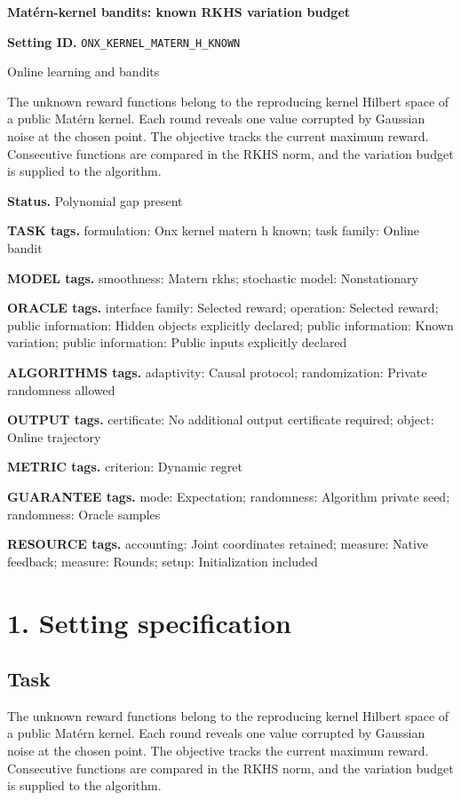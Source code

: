 \documentclass[10pt,a4paper]{article}
\begin{document}
\raggedright

{\LARGE\bfseries\sffamily\color{AtlasNavy} Matérn-kernel bandits: known RKHS variation budget\par}\vspace{5pt}
\textbf{Setting ID.} \texttt{ONX\_\allowbreak{}KERNEL\_\allowbreak{}MATERN\_\allowbreak{}H\_\allowbreak{}KNOWN}

Online learning and bandits

The unknown reward functions belong to the reproducing kernel Hilbert space of a public Matérn kernel. Each round reveals one value corrupted by Gaussian noise at the chosen point. The objective tracks the current maximum reward. Consecutive functions are compared in the RKHS norm, and the variation budget is supplied to the algorithm.

\textbf{Status.} Polynomial gap present

\textbf{TASK tags.} formulation: Onx kernel matern h known; task family: Online bandit

\textbf{MODEL tags.} smoothness: Matern rkhs; stochastic model: Nonstationary

\textbf{ORACLE tags.} interface family: Selected reward; operation: Selected reward; public information: Hidden objects explicitly declared; public information: Known variation; public information: Public inputs explicitly declared

\textbf{ALGORITHMS tags.} adaptivity: Causal protocol; randomization: Private randomness allowed

\textbf{OUTPUT tags.} certificate: No additional output certificate required; object: Online trajectory

\textbf{METRIC tags.} criterion: Dynamic regret

\textbf{GUARANTEE tags.} mode: Expectation; randomness: Algorithm private seed; randomness: Oracle samples

\textbf{RESOURCE tags.} accounting: Joint coordinates retained; measure: Native feedback; measure: Rounds; setup: Initialization included

\section{1. Setting specification}
\subsection{Task}
The unknown reward functions belong to the reproducing kernel Hilbert space of a public Matérn kernel. Each round reveals one value corrupted by Gaussian noise at the chosen point. The objective tracks the current maximum reward. Consecutive functions are compared in the RKHS norm, and the variation budget is supplied to the algorithm.
\end{document}
